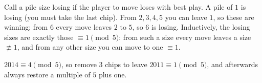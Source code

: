 Call a pile size losing if the player to move loses with best play. A pile of $1$ is losing (you must take the last chip). From $2,3,4,5$ you can leave $1$, so these are winning; from $6$ every move leaves $2$ to $5$, so $6$ is losing. Inductively, the losing sizes are exactly those $\equiv1\pmod5$: from such a size every move leaves a size $\not\equiv1$, and from any other size you can move to one $\equiv1$.

$2014\equiv4\pmod5$, so remove $\boxed{3}$ chips to leave $2011\equiv1\pmod5$, and afterwards always restore a multiple of $5$ plus one.
